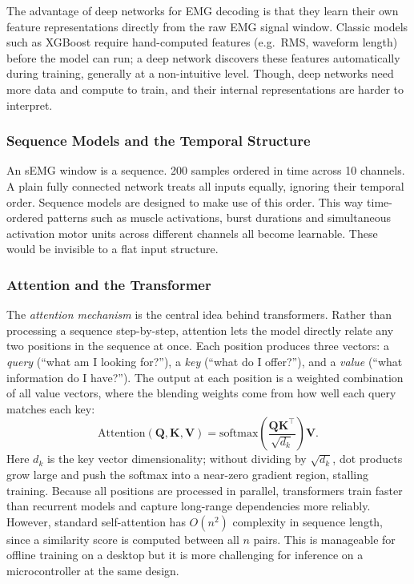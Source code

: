 \documentclass[11pt]{article}
\begin{document}
The advantage of deep networks for EMG decoding is that they learn their own feature representations directly from the raw EMG signal window. Classic models such as XGBoost require hand-computed features (e.g.\ RMS, waveform length) before the model can run; a deep network discovers these features automatically during training, generally at a non-intuitive level. Though, deep networks need more data and compute to train, and their internal representations are harder to interpret.

\subsubsection{Sequence Models and the Temporal Structure}
An sEMG window is a sequence. 200 samples ordered in time across 10 channels. A plain fully connected network treats all inputs equally, ignoring their temporal order. Sequence models are designed to make use of this order. This way time-ordered patterns such as muscle activations, burst durations and simultaneous activation motor units across different channels all become learnable. These would be invisible to a flat input structure.

\subsubsection{Attention and the Transformer}
The \emph{attention mechanism} is the central idea behind transformers. Rather than processing a sequence step-by-step, attention lets the model directly relate any two positions in the sequence at once. Each position produces three vectors: a \emph{query} (``what am I looking for?''), a \emph{key} (``what do I offer?''), and a \emph{value} (``what information do I have?''). The output at each position is a weighted combination of all value vectors, where the blending weights come from how well each query matches each key:
\begin{equation}
\text{Attention}(\mathbf{Q}, \mathbf{K}, \mathbf{V})
= \text{softmax}\!\left(\frac{\mathbf{Q}\mathbf{K}^\top}{\sqrt{d_k}}\right)\mathbf{V}.
\end{equation}
Here $d_k$ is the key vector dimensionality; without dividing by $\sqrt{d_k}$, dot products grow large and push the softmax into a near-zero gradient region, stalling training. Because all positions are processed in parallel, transformers train faster than recurrent models and capture long-range dependencies more reliably. However, standard self-attention has $O(n^2)$ complexity in sequence length, since a similarity score is computed between all $n$ pairs. This is manageable for offline training on a desktop but it is more challenging  for inference on a microcontroller at the same design.  
\end{document}

